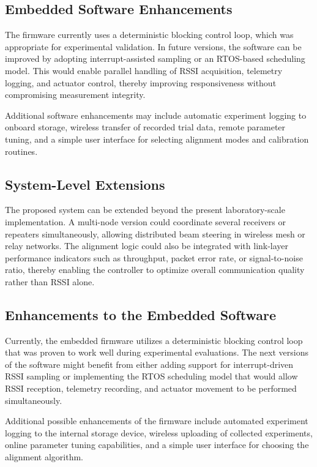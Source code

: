 \subsection{Embedded Software Enhancements}

The firmware currently uses a deterministic blocking control loop, which was appropriate
for experimental validation. In future versions, the software can be improved by adopting
interrupt-assisted sampling or an RTOS-based scheduling model. This would enable parallel
handling of RSSI acquisition, telemetry logging, and actuator control, thereby improving
responsiveness without compromising measurement integrity.

Additional software enhancements may include automatic experiment logging to onboard
storage, wireless transfer of recorded trial data, remote parameter tuning, and a simple
user interface for selecting alignment modes and calibration routines.

\subsection{System-Level Extensions}

The proposed system can be extended beyond the present laboratory-scale implementation.
A multi-node version could coordinate several receivers or repeaters simultaneously,
allowing distributed beam steering in wireless mesh or relay networks. The alignment logic
could also be integrated with link-layer performance indicators such as throughput, packet
error rate, or signal-to-noise ratio, thereby enabling the controller to optimize overall
communication quality rather than RSSI alone.

\subsection{Enhancements to the Embedded Software}

Currently, the embedded firmware utilizes a deterministic blocking control loop that was proven to work well during experimental evaluations. The next versions of the software might benefit from either adding support for interrupt-driven RSSI sampling or implementing the RTOS scheduling model that would allow RSSI reception, telemetry recording, and actuator movement to be performed simultaneously.

Additional possible enhancements of the firmware include automated experiment logging to the internal storage device, wireless uploading of collected experiments, online parameter tuning capabilities, and a simple user interface for choosing the alignment algorithm.

